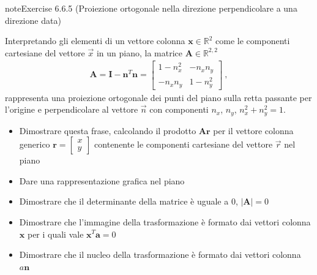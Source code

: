 \documentclass[letterpaper,10pt,italian]{jupyterBook}
\begin{document}
\begin{sphinxadmonition}{note}{Exercise 6.6.5 (Proiezione ortogonale nella direzione perpendicolare a una direzione data)}



\sphinxAtStartPar
Interpretando gli elementi di un vettore colonna \(\mathbf{x} \in \mathbb{R}^2\) come le componenti cartesiane del vettore \(\vec{x}\) in un piano, la matrice \(\mathbf{A} \in \mathbb{R}^{2,2}\)
\begin{equation*}
\begin{split}\mathbf{A} = \mathbf{I} - \mathbf{n}^T \mathbf{n} = \begin{bmatrix} 1- n_x^2 & -n_x n_y \\ - n_x n_y & 1 - n_y^2 \end{bmatrix} \ ,\end{split}
\end{equation*}
\sphinxAtStartPar
rappresenta una proiezione ortogonale dei punti del piano sulla retta passante per l’origine e perpendicolare al vettore \(\vec{n}\) con componenti \(n_x\), \(n_y\), \(n_x^2 + n_y^2 = 1\).
\begin{itemize}
\item {} 
\sphinxAtStartPar
Dimostrare questa frase, calcolando il prodotto \(\mathbf{A} \mathbf{r}\) per il vettore colonna generico \(\mathbf{r} = \begin{bmatrix} x \\ y \end{bmatrix}\) contenente le componenti cartesiane del vettore \(\vec{r}\) nel piano

\item {} 
\sphinxAtStartPar
Dare una rappresentazione grafica nel piano

\item {} 
\sphinxAtStartPar
Dimostrare che il determinante della matrice è uguale a 0, \(|\mathbf{A}| = 0\)

\item {} 
\sphinxAtStartPar
Dimostrare che l’immagine della trasformazione è formato dai vettori colonna \(\mathbf{x}\) per i quali vale \(\mathbf{x}^T \mathbf{a}=0\)

\item {} 
\sphinxAtStartPar
Dimostrare che il nucleo della trasformazione è formato dai vettori colonna \(a \mathbf{n}\)

\end{itemize}
\end{sphinxadmonition}
 \label{exercise:ch/algebra/linear-algebra-exercise-12}
\end{document}
